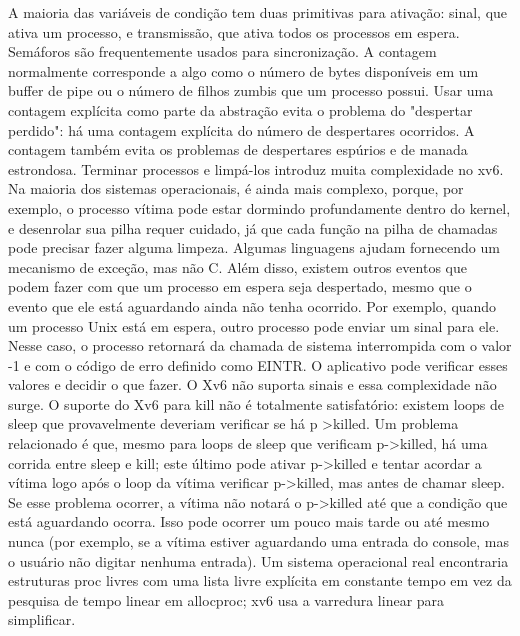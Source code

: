  A  maioria  das  variáveis  de  condição  tem  duas  primitivas  para  ativação:  sinal,  que  ativa  um  processo,  e  transmissão,  
que  ativa  todos  os  processos  em  espera.
 Semáforos  são  frequentemente  usados  para  sincronização.  A  contagem  normalmente  corresponde  a  algo  como  o  número  de  
bytes  disponíveis  em  um  buffer  de  pipe  ou  o  número  de  filhos  zumbis  que  um  processo  possui.  Usar  uma  contagem  explícita  como  
parte  da  abstração  evita  o  problema  do  "despertar  perdido":  há  uma  contagem  explícita  do  número  de  despertares  ocorridos.  A  
contagem  também  evita  os  problemas  de  despertares  espúrios  e  de  manada  estrondosa.
 Terminar  processos  e  limpá-los  introduz  muita  complexidade  no  xv6.  Na  maioria  dos  sistemas  operacionais,  é  ainda  
mais  complexo,  porque,  por  exemplo,  o  processo  vítima  pode  estar  dormindo  profundamente  dentro  do  kernel,  e  desenrolar  
sua  pilha  requer  cuidado,  já  que  cada  função  na  pilha  de  chamadas  pode  precisar  fazer  alguma  limpeza.  Algumas  
linguagens  ajudam  fornecendo  um  mecanismo  de  exceção,  mas  não  C.  Além  disso,  existem  outros  eventos  que  podem  
fazer  com  que  um  processo  em  espera  seja  despertado,  mesmo  que  o  evento  que  ele  está  aguardando  ainda  não  tenha  
ocorrido.  Por  exemplo,  quando  um  processo  Unix  está  em  espera,  outro  processo  pode  enviar  um  sinal  para  ele.  Nesse  
caso,  o  processo  retornará  da  chamada  de  sistema  interrompida  com  o  valor  -1  e  com  o  código  de  erro  definido  como  
EINTR.  O  aplicativo  pode  verificar  esses  valores  e  decidir  o  que  fazer.  O  Xv6  não  suporta  sinais  e  essa  complexidade  não  
surge.
 O  suporte  do  Xv6  para  kill  não  é  totalmente  satisfatório:  existem  loops  de  sleep  que  provavelmente  deveriam  verificar  se  há  p
>killed.  Um  problema  relacionado  é  que,  mesmo  para  loops  de  sleep  que  verificam  p->killed,  há  uma  corrida  entre  sleep  e  kill;  este  
último  pode  ativar  p->killed  e  tentar  acordar  a  vítima  logo  após  o  loop  da  vítima  verificar  p->killed,  mas  antes  de  chamar  sleep.  Se  
esse  problema  ocorrer,  a  vítima  não  notará  o  p->killed  até  que  a  condição  que  está  aguardando  ocorra.  Isso  pode  ocorrer  um  
pouco  mais  tarde  ou  até  mesmo  nunca  (por  exemplo,  se  a  vítima  estiver  aguardando  uma  entrada  do  console,  mas  o  usuário  não  
digitar  nenhuma  entrada).
 Um  sistema  operacional  real  encontraria  estruturas  proc  livres  com  uma  lista  livre  explícita  em  constante
 tempo  em  vez  da  pesquisa  de  tempo  linear  em  allocproc;  xv6  usa  a  varredura  linear  para  simplificar.

